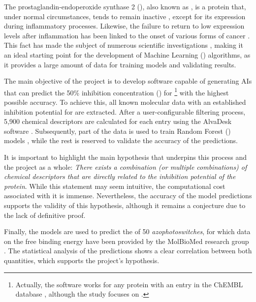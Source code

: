 \documentclass[11pt]{article}
\newcommand\TitolTFG{AI Application for Azophotoswitches Optimization with Pharmacological Interest}
\begin{document}
The prostaglandin-endoperoxide synthase 2 (), also known as , is a protein that, under normal circumstances, tends to remain inactive \cite{Cox2Location}, except for its expression during inflammatory processes. Likewise, the failure to return to low expression levels after inflammation has been linked to the onset of various forms of cancer \cite{DefinitionCOX2CancerDictionary}. This fact has made  the subject of numerous scientific investigations \cite{Cox2InhibitorsReview}, making it an ideal starting point for the development of Machine Learning () algorithms, as it provides a large amount of data for training models and validating results.

The main objective of the project is to develop software capable of generating AIs that can predict the 50\% inhibition concentration () for \footnote{Actually, the software works for any protein with an entry in the ChEMBL database \cite{ChemblDatabase}, although the study focuses on .} with the highest possible accuracy. To achieve this, all known molecular data with an established inhibition potential for  are extracted. After a user-configurable filtering process, 5,900 chemical descriptors are calculated for each entry using the AlvaDesk software \cite{MauriMolecularDescriptorsBook}\cite{AlvaDescSecondPaper}. Subsequently, part of the data is used to train Random Forest () models \cite{MachineLearningRandomForest}, while the rest is reserved to validate the accuracy of the predictions.

It is important to highlight the main hypothesis that underpins this process and the project as a whole: \emph{There exists a combination (or multiple combinations) of chemical descriptors that are directly related to the inhibition potential of the protein}. While this statement may seem intuitive, the computational cost associated with it is immense. Nevertheless, the accuracy of the model predictions supports the validity of this hypothesis, although it remains a conjecture due to the lack of definitive proof.

Finally, the models are used to predict the  of 50 \emph{azophotoswitches}, for which data on the free binding energy have been provided by the MolBioMed research group \cite{molbiomed}. The statistical analysis of the predictions shows a clear correlation between both quantities, which supports the project's hypothesis.

\newpage
\thispagestyle{sumari}
\tableofcontents{}
\end{document}
